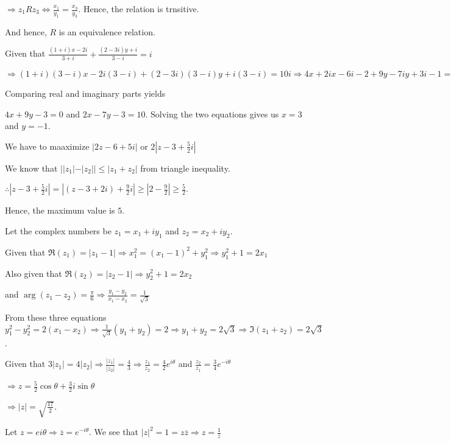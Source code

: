   $\Rightarrow z_1Rz_3 \Leftrightarrow \frac{x_1}{y_1} = \frac{x_3}{y_3}$. Hence, the relation is trnsitive.

  And hence, $R$ is an equivalence relation.
\item Given that $\frac{(1 + i)x - 2i}{3 + i} + \frac{(2 - 3i)y + i}{3 - i} = i$

  $\Rightarrow (1 + i)(3 - i)x - 2i(3 - i) + (2 - 3i)(3 - i)y + i(3 - i) = 10i\Rightarrow 4x + 2ix - 6i - 2
  + 9y - 7iy + 3i - 1 = 10i$

  Comparing real and imaginary parts yields

  $4x + 9y - 3 = 0$ and $2x - 7y - 3 = 10$. Solving the two equations gives us $x = 3$ and $y = -1$.
\item We have to maaximize $|2z - 6 + 5i|$ or $2\left|z - 3 + \frac{5}{2}i\right|$

  We know that $||z_1| - |z_2||\leq |z_1 + z_2|$ from triangle inequality.

  $\therefore \left|z - 3 + \frac{5}{2}i\right| = \left|(z - 3 + 2i) + \frac{9}{2}i\right|\geq \left|2 -
  \frac{9}{2}\right|\geq \frac{5}{2}$.

  Hence, the maximum value is $5$.
\item Let the complex numbers be $z_1 = x_1 + iy_1$ and $z_2 = x_2 + iy_2$.

  Given that $\Re(z_1) = |z_1 - 1| \Rightarrow x_1^2 = (x_1 - 1)^2 + y_1^2 \Rightarrow y_1^2 + 1 = 2x_1$

  Also given that $\Re(z_2) = |z_2 - 1|\Rightarrow y_2^2 + 1 = 2x_2$

  and $\arg(z_1 - z_2) = \frac{\pi}{6}\Rightarrow \frac{y_1 - y_2}{x_1 - x_2} = \frac{1}{\sqrt{3}}$

  From these three equations $y_1^2 - y_2^2 = 2(x_1 - x_2) \Rightarrow \frac{1}{\sqrt{3}}(y_1 + y_2) = 2
  \Rightarrow y_1 + y_2 = 2\sqrt{3}\Rightarrow \Im(z_1 + z_2) = 2\sqrt{3}$.
\item Given that $3|z_1| = 4|z_2|\Rightarrow \frac{|z_1|}{|z_2|} = \frac{4}{3}\Rightarrow \frac{z_1}{z_2} =
  \frac{4}{2}e^{i\theta}$ and $\frac{z_2}{z_1} = \frac{3}{4}e^{-i\theta}$

  $\Rightarrow z = \frac{5}{2}\cos\theta + \frac{3}{2}i\sin\theta$

  $\Rightarrow |z| = \sqrt{\frac{17}{2}}$.
\item Let $z = e{i\theta}\Rightarrow \overline{z} = e^{-i\theta}$. We see that $|z|^2 = 1 =
  z\overline{z}\Rightarrow z = \frac{1}{\overline{z}}$

